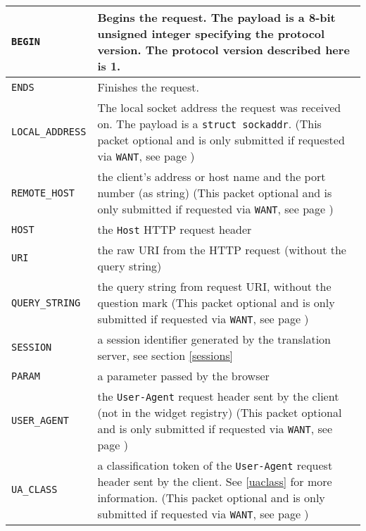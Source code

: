 \documentclass[a4paper,12pt]{article}
\begin{document}
\begin{longtable}{|l|p{10cm}|}
\hline

\verb|BEGIN| & Begins the request.  The payload is a 8-bit unsigned
integer specifying the protocol version.  The protocol version
described here is 1. \\

\hline

\verb|ENDS| & Finishes the request. \\

\hline

\verb|LOCAL_ADDRESS| & The local socket address the request was
received on.  The payload is a \texttt{struct sockaddr}.
(This packet optional and is only submitted if requested via
\verb|WANT|, see page \pageref{want}) \\

\hline

\verb|REMOTE_HOST| & the client's address or host name and the port
number (as string)
(This packet optional and is only submitted if requested via
\verb|WANT|, see page \pageref{want}) \\

\hline
\verb|HOST| & the \texttt{Host} HTTP request header \\
\hline
\verb|URI| & the raw URI from the HTTP request (without the query
string) \\
\hline

\verb|QUERY_STRING| & the query string from request URI, without
the question mark
(This packet optional and is only submitted if requested via
\verb|WANT|, see page \pageref{want}) \\

\hline
\verb|SESSION| & a session identifier generated by the translation
server, see section \ref{sessions} \\
\hline
\verb|PARAM| & a parameter passed by the browser \\

\hline

\verb|USER_AGENT| & the \texttt{User-Agent} request header sent by
the client (not in the widget registry)
(This packet optional and is only submitted if requested via
\verb|WANT|, see page \pageref{want}) \\

\hline

\verb|UA_CLASS| & a classification token of the \texttt{User-Agent}
request header sent by the client.  See \ref{uaclass} for more
information.
(This packet optional and is only submitted if requested via
\verb|WANT|, see page \pageref{want}) \\


\end{longtable}
\end{document}
